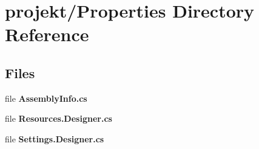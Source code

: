 \section{projekt/\+Properties Directory Reference}
\label{dir_bad29f1396e12a772b77902c6b2a55c9}
\subsection*{Files}
\begin{DoxyCompactItemize}
\item 
file \textbf{ Assembly\+Info.\+cs}
\item 
file \textbf{ Resources.\+Designer.\+cs}
\item 
file \textbf{ Settings.\+Designer.\+cs}
\end{DoxyCompactItemize}
